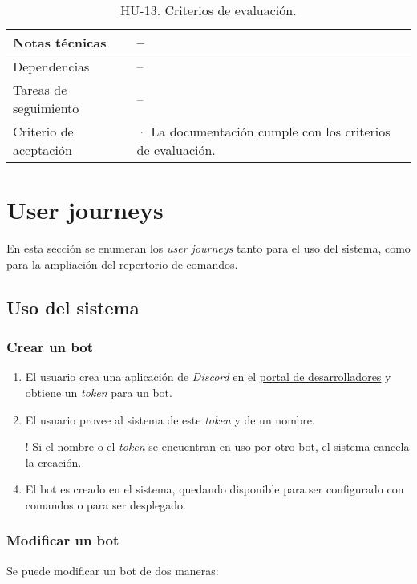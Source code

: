 \begin{table}[H]
\begin{adjustbox}{max width=\textwidth}
\begin{tabularx}{\textwidth}{|l|L|}
        Notas técnicas & – \\ \hline
        Dependencias & – \\ \hline
        Tareas de seguimiento & – \\ \hline
        Criterio de aceptación & · La documentación cumple con los criterios de evaluación. \\ \hline
    \end{tabularx}
    \end{adjustbox}
    \caption{HU-13. Criterios de evaluación.}
\end{table}
 
\section{User journeys}

En esta sección se enumeran los \textit{user journeys} tanto para el uso del sistema, como para la ampliación del repertorio de comandos.

\subsection{Uso del sistema}

\subsubsection{Crear un bot}

\begin{enumerate}
	\item El usuario crea una aplicación de \textit{Discord} en el \href{https://discord.com/developers/applications}{portal de desarrolladores} y obtiene un \textit{token} para un bot.
	\item El usuario provee al sistema de este \textit{token} y de un nombre.
	\item[!] Si el nombre o el \textit{token} se encuentran en uso por otro bot, el sistema cancela la creación.
	\item El bot es creado en el sistema, quedando disponible para ser configurado con comandos o para ser desplegado.
\end{enumerate}

\subsubsection{Modificar un bot}

Se puede modificar un bot de dos maneras:

